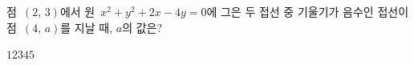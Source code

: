 점~$(2,\,3)$에서 원~$x^2+y^2+2x-4y=0$에 그은 두 접선 중 기울기가 음수인 접선이 점~$(4,\,a)$를 지날 때, $a$의 값은?
\begin{choices32}{$1$}{$2$}{$3$}{$4$}{$5$}\end{choices32}
